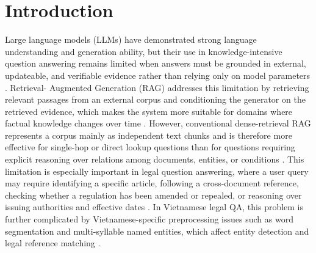 \documentclass[11pt,twocolumn]{article}
\begin{document}
\section{Introduction}
\label{sec:intro}

Large language models (LLMs) have demonstrated strong
language understanding and generation ability, but their use
in knowledge-intensive question answering remains limited
when answers must be grounded in external, updateable, and
verifiable evidence rather than relying only on model
parameters \cite{lewis2020rag,guu2020realm}. Retrieval-
Augmented Generation (RAG) addresses this limitation by
retrieving relevant passages from an external corpus and
conditioning the generator on the retrieved evidence, which
makes the system more suitable for domains where factual
knowledge changes over time \cite{karpukhin2020dpr,
asai2023selfrag}. However, conventional dense-retrieval RAG
represents a corpus mainly as independent text chunks and is
therefore more effective for single-hop or direct lookup
questions than for questions requiring explicit reasoning
over relations among documents, entities, or conditions
\cite{trivedi2023interleaving,press2023measuring}. This
limitation is especially important in legal question
answering, where a user query may require identifying a
specific article, following a cross-document reference,
checking whether a regulation has been amended or repealed,
or reasoning over issuing authorities and effective dates
\cite{chalkidis2020legalbert,zhong2020nlp_law,
sovrano2020legalkg}. In Vietnamese legal QA, this problem
is further complicated by Vietnamese-specific preprocessing
issues such as word segmentation and multi-syllable named
entities, which affect entity detection and legal reference
matching \cite{nguyen2020phobert,vu2018vncorenlp}.
\end{document}
